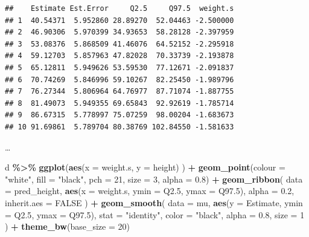 \documentclass[
  a4paper,11pt,twoside,onecolumn,openright,final,oldfontcommands]{memoir}
\newenvironment{Shaded}{\begin{snugshade}}{\end{snugshade}}
\newcommand{\DataTypeTok}[1]{\textcolor[rgb]{0.13,0.29,0.53}{#1}}
\newcommand{\DecValTok}[1]{\textcolor[rgb]{0.00,0.00,0.81}{#1}}
\newcommand{\FloatTok}[1]{\textcolor[rgb]{0.00,0.00,0.81}{#1}}
\newcommand{\KeywordTok}[1]{\textcolor[rgb]{0.13,0.29,0.53}{\textbf{#1}}}
\newcommand{\NormalTok}[1]{#1}
\newcommand{\OperatorTok}[1]{\textcolor[rgb]{0.81,0.36,0.00}{\textbf{#1}}}
\newcommand{\OtherTok}[1]{\textcolor[rgb]{0.56,0.35,0.01}{#1}}
\newcommand{\StringTok}[1]{\textcolor[rgb]{0.31,0.60,0.02}{#1}}
\theoremstyle{definition}
\theoremstyle{definition}
\theoremstyle{definition}
\theoremstyle{remark}
\begin{document}
\begin{verbatim}
##    Estimate Est.Error     Q2.5     Q97.5  weight.s
## 1  40.54371  5.952860 28.89270  52.04463 -2.500000
## 2  46.90306  5.970399 34.93653  58.28128 -2.397959
## 3  53.08376  5.868509 41.46076  64.52152 -2.295918
## 4  59.12703  5.857963 47.82028  70.33739 -2.193878
## 5  65.12811  5.949626 53.59530  77.12671 -2.091837
## 6  70.74269  5.846996 59.10267  82.25450 -1.989796
## 7  76.27344  5.806964 64.76977  87.71074 -1.887755
## 8  81.49073  5.949355 69.65843  92.92619 -1.785714
## 9  86.67315  5.778997 75.07259  98.00204 -1.683673
## 10 91.69861  5.789704 80.38769 102.84550 -1.581633
\end{verbatim}

\ldots{}

\begin{Shaded}
\begin{Highlighting}[]
\NormalTok{d }\OperatorTok{\%\textgreater{}\%}
\StringTok{  }\KeywordTok{ggplot}\NormalTok{(}\KeywordTok{aes}\NormalTok{(}\DataTypeTok{x =}\NormalTok{ weight.s, }\DataTypeTok{y =}\NormalTok{ height) ) }\OperatorTok{+}
\StringTok{  }\KeywordTok{geom\_point}\NormalTok{(}\DataTypeTok{colour =} \StringTok{"white"}\NormalTok{, }\DataTypeTok{fill =} \StringTok{"black"}\NormalTok{, }\DataTypeTok{pch =} \DecValTok{21}\NormalTok{, }\DataTypeTok{size =} \DecValTok{3}\NormalTok{, }\DataTypeTok{alpha =} \FloatTok{0.8}\NormalTok{) }\OperatorTok{+}
\StringTok{  }\KeywordTok{geom\_ribbon}\NormalTok{(}
    \DataTypeTok{data =}\NormalTok{ pred\_height, }\KeywordTok{aes}\NormalTok{(}\DataTypeTok{x =}\NormalTok{ weight.s, }\DataTypeTok{ymin =}\NormalTok{ Q2}\FloatTok{.5}\NormalTok{, }\DataTypeTok{ymax =}\NormalTok{ Q97}\FloatTok{.5}\NormalTok{),}
    \DataTypeTok{alpha =} \FloatTok{0.2}\NormalTok{, }\DataTypeTok{inherit.aes =} \OtherTok{FALSE}
\NormalTok{    ) }\OperatorTok{+}
\StringTok{  }\KeywordTok{geom\_smooth}\NormalTok{(}
    \DataTypeTok{data =}\NormalTok{ mu, }\KeywordTok{aes}\NormalTok{(}\DataTypeTok{y =}\NormalTok{ Estimate, }\DataTypeTok{ymin =}\NormalTok{ Q2}\FloatTok{.5}\NormalTok{, }\DataTypeTok{ymax =}\NormalTok{ Q97}\FloatTok{.5}\NormalTok{),}
    \DataTypeTok{stat =} \StringTok{"identity"}\NormalTok{, }\DataTypeTok{color =} \StringTok{"black"}\NormalTok{, }\DataTypeTok{alpha =} \FloatTok{0.8}\NormalTok{, }\DataTypeTok{size =} \DecValTok{1}
\NormalTok{    ) }\OperatorTok{+}
\StringTok{  }\KeywordTok{theme\_bw}\NormalTok{(}\DataTypeTok{base\_size =} \DecValTok{20}\NormalTok{)}
\end{Highlighting}
\end{Shaded}
\end{document}
